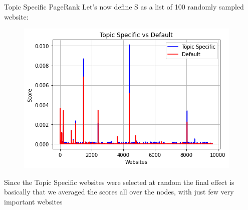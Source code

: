 \documentclass[10pt]{beamer}
\begin{document}
\begin{frame}{Topic Specific PageRank}
Let's now define S as a list of 100 randomly sampled website:
\begin{center}
\begin{figure}[h] 
\centering 
\includegraphics[scale=0.6]{random100}
\end{figure}
\end{center}

Since the Topic Specific websites were selected at random the final effect is basically that we averaged the scores all over the nodes, with just few very important websites

\end{frame}
\end{document}
